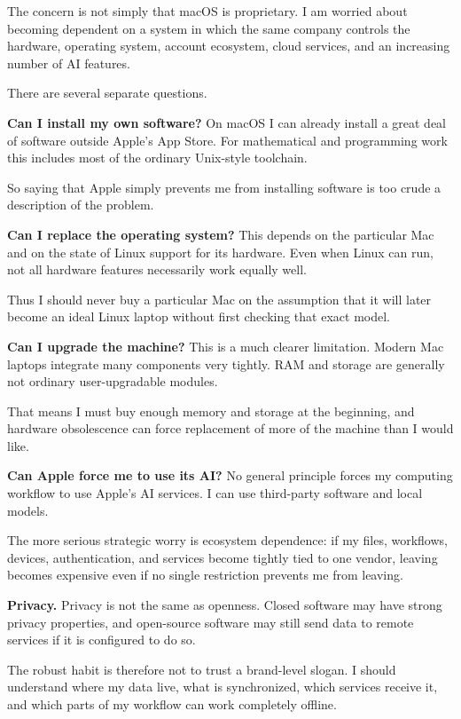 The concern is not simply that macOS is
proprietary.  I am worried about becoming
dependent on a system in which the same
company controls the hardware, operating
system, account ecosystem, cloud services,
and an increasing number of AI features.

There are several separate questions.

\medskip\noindent
{\bf Can I install my own software?}
On macOS I can already install a great deal
of software outside Apple's App Store.
For mathematical and programming work this
includes most of the ordinary Unix-style
toolchain.

So saying that Apple simply prevents me
from installing software is too crude a
description of the problem.

\medskip\noindent
{\bf Can I replace the operating system?}
This depends on the particular Mac and on
the state of Linux support for its
hardware.  Even when Linux can run, not all
hardware features necessarily work equally
well.

Thus I should never buy a particular Mac
on the assumption that it will later
become an ideal Linux laptop without first
checking that exact model.

\medskip\noindent
{\bf Can I upgrade the machine?}
This is a much clearer limitation.
Modern Mac laptops integrate many
components very tightly.  RAM and storage
are generally not ordinary user-upgradable
modules.

That means I must buy enough memory and
storage at the beginning, and hardware
obsolescence can force replacement of more
of the machine than I would like.

\medskip\noindent
{\bf Can Apple force me to use its AI?}
No general principle forces my computing
workflow to use Apple's AI services.  I
can use third-party software and local
models.

The more serious strategic worry is
ecosystem dependence: if my files,
workflows, devices, authentication, and
services become tightly tied to one
vendor, leaving becomes expensive even if
no single restriction prevents me from
leaving.

\medskip\noindent
{\bf Privacy.}
Privacy is not the same as openness.
Closed software may have strong privacy
properties, and open-source software may
still send data to remote services if it
is configured to do so.

The robust habit is therefore not to trust
a brand-level slogan.  I should understand
where my data live, what is synchronized,
which services receive it, and which parts
of my workflow can work completely
offline.

